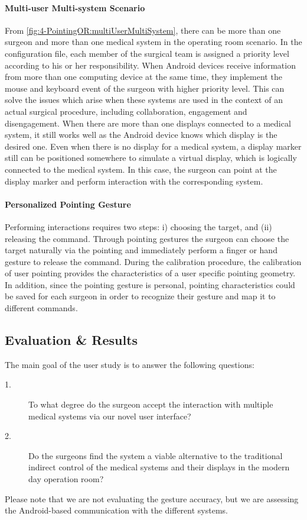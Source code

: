 {\paragraph{Multi-user Multi-system Scenario}
From \figurename{\ref{fig:4-PointingOR:multiUserMultiSystem}}, there can be more than one surgeon and more than one medical system in the operating room scenario. In the configuration file, each member of the surgical team is assigned a priority level according to his or her responsibility. When Android devices receive information from more than one computing device at the same time, they implement the mouse and keyboard event of the surgeon with higher priority level. This can solve the issues which arise when these systems are used in the context of an actual surgical procedure, including collaboration, engagement and disengagement. When there are more than one displays connected to a medical system, it still works well as the Android device knows which display is the desired one. Even when there is no display for a medical system, a display marker still can be positioned somewhere to simulate a virtual display, which is logically connected to the medical system. In this case, the surgeon can point at the display marker and perform interaction with the corresponding system.
\paragraph{Personalized Pointing Gesture}
Performing interactions requires two steps: i) choosing the target, and (ii) releasing the command. Through pointing gestures the surgeon can choose the target naturally via the pointing and immediately perform a finger or hand gesture to release the command. During the calibration procedure, the calibration of user pointing provides the characteristics of a user specific pointing geometry. In addition, since the pointing gesture is personal, pointing characteristics could be saved for each surgeon in order to recognize their gesture and map it to different commands.

\subsection{Evaluation \& Results}
The main goal of the user study is to answer the following questions: 
\begin{description}
	\item[1.] To what degree do the surgeon accept the interaction with multiple medical systems via our novel user interface?
	\item[2.] Do the surgeons find the system a viable alternative to the traditional indirect control of the medical systems and their displays in the modern day operation room?
\end{description}
Please note that we are not evaluating the gesture accuracy, but we are assessing the Android-based communication with the different systems. 
}
